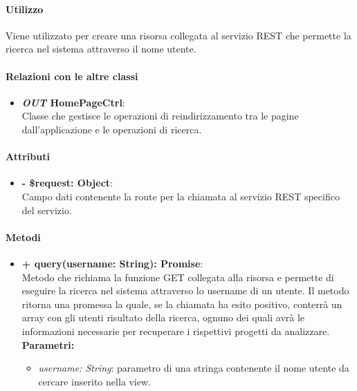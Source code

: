 	\paragraph{Utilizzo}
	Viene utilizzato per creare una risorsa collegata al servizio REST che permette la ricerca nel sistema attraverso il nome utente.
	
	\paragraph{Relazioni con le altre classi}
	\begin{itemize}
		\item \textbf{\textit{OUT} HomePageCtrl}:\\
		Classe che gestisce le operazioni di reindirizzamento tra le pagine dall'applicazione e le operazioni di ricerca.
	\end{itemize}
	
	\paragraph{Attributi}
	\begin{itemize}
		\item \textbf{- \$request: Object}:\\
		Campo dati contenente la route per la chiamata al servizio REST specifico del servizio.
	\end{itemize}	
	
	\paragraph{Metodi}
	\begin{itemize}
		\item \textbf{+ query(username: String): Promise}:\\
		Metodo che richiama la funzione GET collegata alla risorsa e permette di eseguire la ricerca nel sistema attraverso lo username di un utente. Il metodo ritorna una promessa la quale, se la chiamata ha esito positivo, conterrà un array con gli utenti risultato della ricerca, ognuno dei quali avrà le informazioni necessarie per recuperare i rispettivi progetti da analizzare.\\
		\textbf{Parametri:}\\
		\begin{itemize}
			\item \textit{username: String}: parametro di una stringa contenente il nome utente da cercare inserito nella view.
		\end{itemize}
	\end{itemize}


